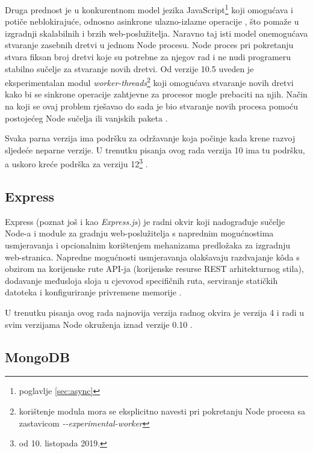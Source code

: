 \documentclass[times, utf8, diplomski, numeric]{fer}
\newcommand{\razmaks}{\vspace{10pt}}
\begin{document}
Druga prednost je u konkurentnom model jezika JavaScript\footnote{poglavlje \ref{sec:async}} koji omogućava i potiče neblokirajuće, odnosno asinkrone ulazno-izlazne operacije , što pomaže u izgradnji skalabilnih i brzih web-poslužitelja.
Naravno taj isti model onemogućava stvaranje zasebnih dretvi u jednom Node procesu. Node proces pri pokretanju stvara fiksan broj dretvi koje su potrebne za njegov rad i ne nudi programeru stabilno sučelje za stvaranje novih dretvi.
Od verzije 10.5 uveden je eksperimentalan modul \emph{worker-threads}\footnote{
    korištenje modula mora se eksplicitno navesti pri pokretanju Node procesa sa zastavicom \emph{-{}-experimental-worker}
} koji omogućava stvaranje novih dretvi kako bi se sinkrone operacije zahtjevne za procesor  mogle prebaciti na njih.
Način na koji se ovaj problem rješavao do sada je bio stvaranje novih procesa pomoću postojećeg Node sučelja ili vanjskih paketa \citep{art_node}.

Svaka parna verzija ima podršku za održavanje  koja počinje kada krene razvoj sljedeće neparne verzije.
U trenutku pisanja ovog rada verzija 10 ima tu podršku, a uskoro kreće podrška za verziju 12\footnote{od 10. listopada 2019.} \citep{wiki_node}.


\newpage
\subsection{Express}

Express (poznat još i kao \emph{Express.js}) je radni okvir  koji nadograđuje sučelje Node-a i module za gradnju web-poslužitelja s naprednim mogućnostima usmjeravanja  i opcionalnim korištenjem mehanizama predložaka  za izgradnju web-stranica.
Napredne mogućnosti usmjeravanja olakšavaju razdvajanje kôda s obzirom na korijenske rute API-ja (korijenske resurse REST arhitekturnog stila), dodavanje međusloja sloja  u cjevovod  specifičnih ruta, serviranje statičkih datoteka i konfiguriranje privremene memorije .

U trenutku pisanja ovog rada najnovija verzija radnog okvira je verzija 4 i radi u svim verzijama Node okruženja iznad verzije 0.10 \citep{gh_express}.


\razmaks
\subsection{MongoDB} \label{sec:mongo}
\end{document}
